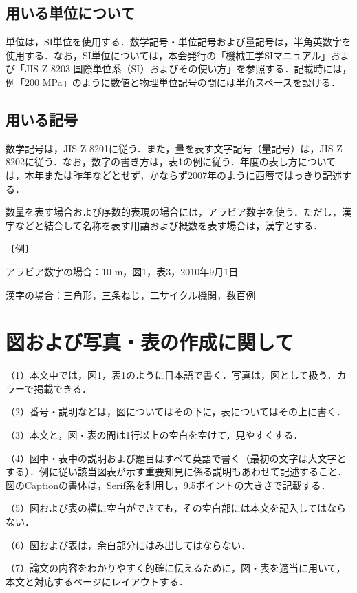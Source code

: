 \documentclass[a4jsme, fleqn]{jsmepaper}
\begin{document}
\subsection{用いる単位について}

単位は，SI単位を使用する．数学記号・単位記号および量記号は，半角英数字を使用する．なお，SI単位については，本会発行の「機械工学SIマニュアル」および「JIS Z 8203 国際単位系（SI）およびその使い方」を参照する．記載時には，例「200 MPa」のように数値と物理単位記号の間には半角スペースを設ける．

\subsection{用いる記号}

数学記号は，JIS Z 8201に従う．また，量を表す文字記号（量記号）は，JIS Z 8202に従う．なお，数字の書き方は，表1の例に従う．年度の表し方については，本年または昨年などとせず，かならず2007年のように西暦ではっきり記述する．

数量を表す場合および序数的表現の場合には，アラビア数字を使う．ただし，漢字などと結合して名称を表す用語および概数を表す場合は，漢字とする．

〔例〕

アラビア数字の場合：10 m，図1，表3，2010年9月1日

漢字の場合：三角形，三条ねじ，二サイクル機関，数百例

\section{図および写真・表の作成に関して}

（1）本文中では，図1，表1のように日本語で書く．写真は，図として扱う．カラーで掲載できる．

（2）番号・説明などは，図についてはその下に，表についてはその上に書く．

（3）本文と，図・表の間は1行以上の空白を空けて，見やすくする．

（4）図中・表中の説明および題目はすべて英語で書く（最初の文字は大文字とする）．例に従い該当図表が示す重要知見に係る説明もあわせて記述すること．図のCaptionの書体は，Serif系を利用し，9.5ポイントの大きさで記載する．

（5）図および表の横に空白ができても，その空白部には本文を記入してはならない．

（6）図および表は，余白部分にはみ出してはならない．

（7）論文の内容をわかりやすく的確に伝えるために，図・表を適当に用いて，本文と対応するページにレイアウトする．
\end{document}
